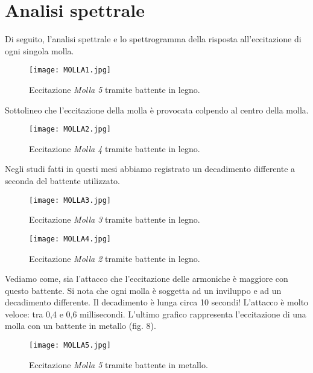 \section{Analisi spettrale}

Di seguito, l'analisi spettrale e lo spettrogramma della risposta all'eccitazione di ogni singola molla. 

\begin{figure}[!h]
\begin{center}
\texttt{[image: MOLLA1.jpg]}
\caption{Eccitazione \textit{Molla 5} tramite battente in legno.}
\label{default}
\end{center}
\end{figure}

Sottolineo che l'eccitazione della molla è provocata colpendo al centro della molla. 

\begin{figure}[!h]
\begin{center}
\texttt{[image: MOLLA2.jpg]}
\caption{Eccitazione \textit{Molla 4} tramite battente in legno.}
\label{default}
\end{center}
\end{figure}

Negli studi fatti in questi mesi abbiamo registrato un decadimento differente a seconda del battente utilizzato.

\begin{figure}[!h]
\begin{center}
\texttt{[image: MOLLA3.jpg]}
\caption{Eccitazione \textit{Molla 3} tramite battente in legno.}
\label{default}
\end{center}
\end{figure}

\begin{figure}[!h]
\begin{center}
\texttt{[image: MOLLA4.jpg]}
\caption{Eccitazione \textit{Molla 2} tramite battente in legno.}
\label{default}
\end{center}
\end{figure}

Vediamo come, sia l'attacco che l'eccitazione delle armoniche è maggiore con questo battente.
Si nota che ogni molla è soggetta ad un inviluppo e ad un decadimento differente. Il decadimento è lunga circa 10 secondi! L'attacco è molto veloce: tra 0,4 e 0,6 millisecondi. 
L'ultimo grafico rappresenta l'eccitazione di una molla con un battente in metallo (fig. 8). 

\begin{figure}[!h]
\begin{center}
\texttt{[image: MOLLA5.jpg]}
\caption{Eccitazione \textit{Molla 5} tramite battente in metallo.}
\label{default}
\end{center}
\end{figure}
